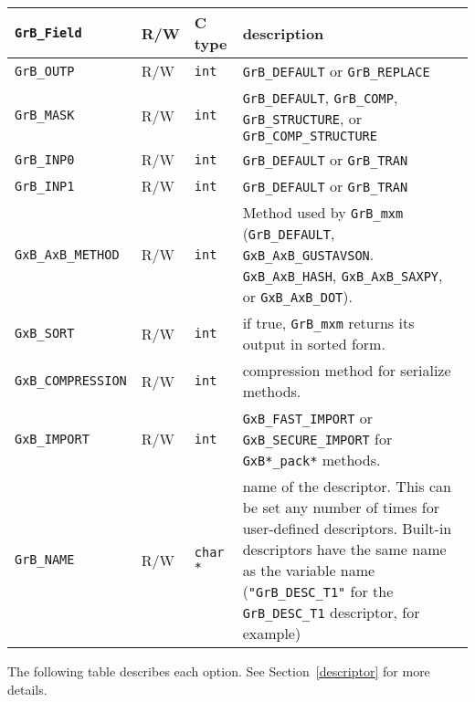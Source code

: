 \noindent
{\small
\begin{tabular}{|l|l|l|p{3.3in}|}
\hline
\verb'GrB_Field'                    & R/W  & C type        & description \\
\hline
\verb'GrB_OUTP'         & R/W  & \verb'int'    & \verb'GrB_DEFAULT' or \verb'GrB_REPLACE' \\
\verb'GrB_MASK'         & R/W  & \verb'int'    & \verb'GrB_DEFAULT', \verb'GrB_COMP', \verb'GrB_STRUCTURE', or
                                                    \newline \verb'GrB_COMP_STRUCTURE' \\
\verb'GrB_INP0'         & R/W  & \verb'int'    & \verb'GrB_DEFAULT' or \verb'GrB_TRAN' \\
\verb'GrB_INP1'         & R/W  & \verb'int'    & \verb'GrB_DEFAULT' or \verb'GrB_TRAN' \\
\verb'GxB_AxB_METHOD'   & R/W  & \verb'int'    & Method used by \verb'GrB_mxm' (\verb'GrB_DEFAULT', \newline
                                                 \verb'GxB_AxB_GUSTAVSON'.  \verb'GxB_AxB_HASH', \newline
                                                 \verb'GxB_AxB_SAXPY', or \verb'GxB_AxB_DOT'). \\
\verb'GxB_SORT'         & R/W  & \verb'int'    & if true, \verb'GrB_mxm' returns its output in sorted form. \\
\verb'GxB_COMPRESSION'  & R/W  & \verb'int'    & compression method for serialize methods. \\
\verb'GxB_IMPORT'       & R/W  & \verb'int'    & \verb'GxB_FAST_IMPORT' or \verb'GxB_SECURE_IMPORT' for \verb'GxB*_pack*' methods. \\
\hline
\verb'GrB_NAME'         & R/W  & \verb'char *' & name of the descriptor.
    This can be set any number of times for user-defined descriptors.  Built-in
    descriptors have the same name as the variable name (\verb'"GrB_DESC_T1"'
    for the \verb'GrB_DESC_T1' descriptor, for example) \\
\hline
\end{tabular}
}

The following table describes each option.
See Section~\ref{descriptor} for more details.

